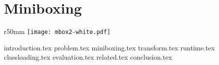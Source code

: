 \chapter{Miniboxing}
\label{chapter:miniboxing}

\begin{wrapfigure}{r}{50mm}
  \centering
  \vspace{-30em}
  \texttt{[image: mbox2-white.pdf]}
  \vspace{-30em}
\end{wrapfigure}

{introduction.tex}
{problem.tex}
{miniboxing.tex}
{transform.tex}
{runtime.tex}
{classloading.tex}
{evaluation.tex}
{related.tex}
{conclusion.tex}

